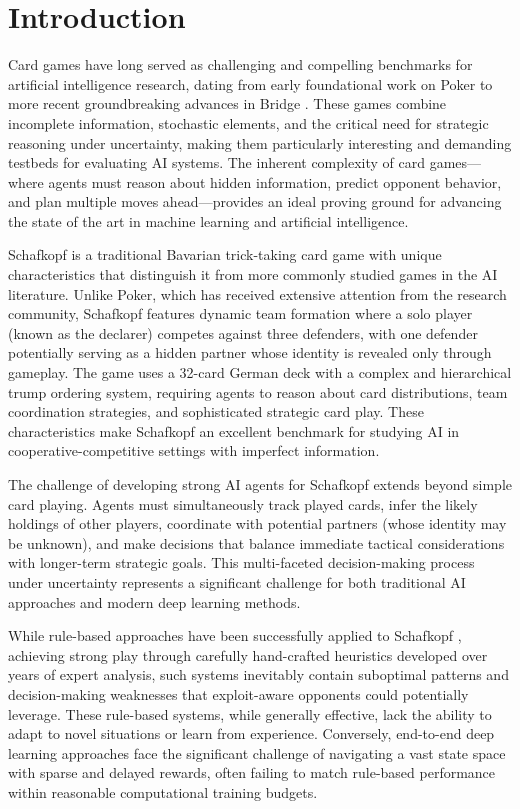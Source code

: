 \documentclass[conference]{IEEEtran}
\begin{document}
\section{Introduction}

Card games have long served as challenging and compelling benchmarks for artificial intelligence research, dating from early foundational work on Poker \cite{billings2002challenge} to more recent groundbreaking advances in Bridge \cite{tian2020joint}. These games combine incomplete information, stochastic elements, and the critical need for strategic reasoning under uncertainty, making them particularly interesting and demanding testbeds for evaluating AI systems. The inherent complexity of card games—where agents must reason about hidden information, predict opponent behavior, and plan multiple moves ahead—provides an ideal proving ground for advancing the state of the art in machine learning and artificial intelligence.

Schafkopf is a traditional Bavarian trick-taking card game with unique characteristics that distinguish it from more commonly studied games in the AI literature. Unlike Poker, which has received extensive attention from the research community, Schafkopf features dynamic team formation where a solo player (known as the declarer) competes against three defenders, with one defender potentially serving as a hidden partner whose identity is revealed only through gameplay. The game uses a 32-card German deck with a complex and hierarchical trump ordering system, requiring agents to reason about card distributions, team coordination strategies, and sophisticated strategic card play. These characteristics make Schafkopf an excellent benchmark for studying AI in cooperative-competitive settings with imperfect information.

The challenge of developing strong AI agents for Schafkopf extends beyond simple card playing. Agents must simultaneously track played cards, infer the likely holdings of other players, coordinate with potential partners (whose identity may be unknown), and make decisions that balance immediate tactical considerations with longer-term strategic goals. This multi-faceted decision-making process under uncertainty represents a significant challenge for both traditional AI approaches and modern deep learning methods.

While rule-based approaches have been successfully applied to Schafkopf \cite{doppelkopf2019}, achieving strong play through carefully hand-crafted heuristics developed over years of expert analysis, such systems inevitably contain suboptimal patterns and decision-making weaknesses that exploit-aware opponents could potentially leverage. These rule-based systems, while generally effective, lack the ability to adapt to novel situations or learn from experience. Conversely, end-to-end deep learning approaches face the significant challenge of navigating a vast state space with sparse and delayed rewards, often failing to match rule-based performance within reasonable computational training budgets.
\end{document}
